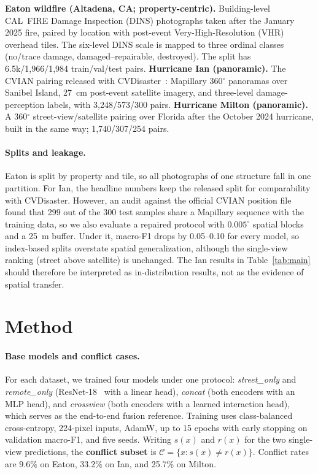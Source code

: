 \documentclass[sigconf]{acmart}
\newcommand{\conf}{\mathcal{C}}
\begin{document}
\textbf{Eaton wildfire (Altadena, CA; property-centric).} Building-level
CAL~FIRE Damage Inspection (DINS) photographs taken after the January 2025
fire, paired by location with post-event Very-High-Resolution (VHR) overhead tiles. The six-level
DINS scale is mapped to three ordinal classes (no/trace damage,
damaged--repairable, destroyed). The split has 6.5k/1,966/1,984
train/val/test pairs.
\textbf{Hurricane Ian (panoramic).} The CVIAN pairing released with
CVDisaster~\cite{li2025cross}: Mapillary 360$^\circ$ panoramas over Sanibel
Island, 27~cm post-event satellite imagery, and three-level damage-perception
labels, with 3,248/573/300 pairs.
\textbf{Hurricane Milton (panoramic).} A 360$^\circ$ street-view/satellite
pairing over Florida after the October 2024 hurricane, built in the same way;
1,740/307/254 pairs.

\paragraph{Splits and leakage.}
Eaton is split by property and tile, so all photographs of one structure fall
in one partition. For Ian, the headline numbers keep the released split for
comparability with CVDisaster. However, an audit against the official CVIAN
position file found that 299 out of the 300 test samples share a Mapillary
sequence with the training data, so we also evaluate a repaired protocol with
$0.005^\circ$ spatial blocks and a 25~m buffer. Under it, macro-F1 drops by
0.05--0.10 for every model, so index-based splits overstate spatial
generalization, although the single-view ranking (street above satellite) is
unchanged. The Ian results in Table~\ref{tab:main} should therefore be interpreted as
in-distribution results, not as the evidence of spatial transfer.

\section{Method}
\paragraph{Base models and conflict cases.}
For each dataset, we trained four models under one protocol:
\textit{street\_only} and \textit{remote\_only} (ResNet-18~\cite{he2016deep}
with a linear head), \textit{concat} (both encoders with an MLP head), and
\textit{crossview} (both encoders with a learned interaction head), which
serves as the end-to-end fusion reference. Training uses class-balanced
cross-entropy, 224-pixel inputs, AdamW, up to 15 epochs with early stopping
on validation macro-F1, and five seeds. Writing $s(x)$ and $r(x)$ for the two
single-view predictions, the \textbf{conflict subset} is
$\conf=\{x: s(x)\neq r(x)\}$. Conflict rates are 9.6\% on Eaton, 33.2\% on
Ian, and 25.7\% on Milton.
\end{document}
